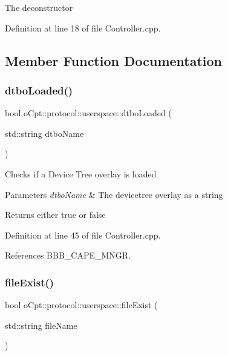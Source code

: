 The deconstructor 

Definition at line 18 of file Controller.\+cpp.



\subsection{Member Function Documentation}
\hypertarget{classo_cpt_1_1protocol_1_1userspace_ac5a9bd7fbdbc94edb7b3baaafabbe11e}{}\label{classo_cpt_1_1protocol_1_1userspace_ac5a9bd7fbdbc94edb7b3baaafabbe11e} 
\subsubsection{\texorpdfstring{dtbo\+Loaded()}{dtboLoaded()}}
{\footnotesize\ttfamily bool o\+Cpt\+::protocol\+::userspace\+::dtbo\+Loaded (\begin{DoxyParamCaption}\item[{std\+::string}]{dtbo\+Name }\end{DoxyParamCaption})\hspace{0.3cm}{\ttfamily [protected]}}

Checks if a Device Tree overlay is loaded 
\begin{DoxyParams}{Parameters}
{\em dtbo\+Name} & The devicetree overlay as a string \\
\hline
\end{DoxyParams}
\begin{DoxyReturn}{Returns}
either true or false 
\end{DoxyReturn}


Definition at line 45 of file Controller.\+cpp.



References B\+B\+B\+\_\+\+C\+A\+P\+E\+\_\+\+M\+N\+GR.

\hypertarget{classo_cpt_1_1protocol_1_1userspace_a3c35e581abd2a06de6feb160e25ac35b}{}\label{classo_cpt_1_1protocol_1_1userspace_a3c35e581abd2a06de6feb160e25ac35b} 
\subsubsection{\texorpdfstring{file\+Exist()}{fileExist()}}
{\footnotesize\ttfamily bool o\+Cpt\+::protocol\+::userspace\+::file\+Exist (\begin{DoxyParamCaption}\item[{std\+::string}]{file\+Name }\end{DoxyParamCaption})\hspace{0.3cm}{\ttfamily [protected]}}

